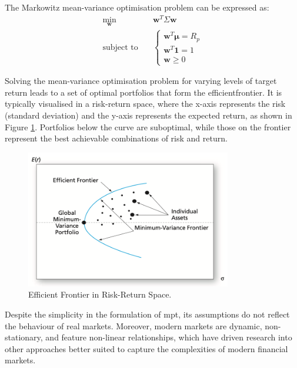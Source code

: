 The Markowitz mean-variance optimisation problem can be expressed as:
\begin{equation}
\begin{aligned}
    \min_{\mathbf{w}} \quad & \mathbf{w}^T \Sigma \mathbf{w} \\
    \text{subject to} \quad &
    \begin{cases}
        \mathbf{w}^T \boldsymbol{\mu} = R_p \\
        \mathbf{w}^T \mathbf{1} = 1 \\
        \mathbf{w} \geq 0
    \end{cases}
\end{aligned}
\end{equation}

Solving the mean-variance optimisation problem for varying levels of target return leads to a set of optimal portfolios that form the \gls{efficientfrontier}. It is typically visualised in a risk-return space, where the x-axis represents the risk (standard deviation) and the y-axis represents the expected return, as shown in Figure \ref{fig:efficient_frontier}. Portfolios below the curve are suboptimal, while those on the frontier represent the best achievable combinations of risk and return.

\begin{figure}[ht]
    \centering
    \includegraphics[width=0.8\textwidth]{figures/markowitz-efficient-frontier.png}
    \caption{Efficient Frontier in Risk-Return Space. \cite{Bodie2014}}
    \label{fig:efficient_frontier}
\end{figure}

Despite the simplicity in the formulation of \acrshort{mpt}, its assumptions do not reflect the behaviour of real markets. Moreover, modern markets are dynamic, non-stationary, and feature non-linear relationships, which have driven research into other approaches better suited to capture the complexities of modern financial markets. 

